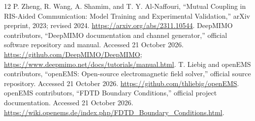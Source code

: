 \begin{thebibliography}{12}
 P. Zheng, R. Wang, A. Shamim, and T. Y. Al-Naffouri, ``Mutual Coupling in RIS-Aided Communication: Model Training and Experimental Validation,'' arXiv preprint, 2023; revised 2024. \url{https://arxiv.org/abs/2311.10544}.
 DeepMIMO contributors, ``DeepMIMO documentation and channel generator,'' official software repository and manual. Accessed 21 October 2026. \url{https://github.com/DeepMIMO/DeepMIMO}; \url{https://www.deepmimo.net/docs/tutorials/manual.html}.
 T. Liebig and openEMS contributors, ``openEMS: Open-source electromagnetic field solver,'' official source repository. Accessed 21 October 2026. \url{https://github.com/thliebig/openEMS}.
 openEMS contributors, ``FDTD Boundary Conditions,'' official project documentation. Accessed 21 October 2026. \url{https://wiki.openems.de/index.php/FDTD_Boundary_Conditions.html}.
\end{thebibliography}
